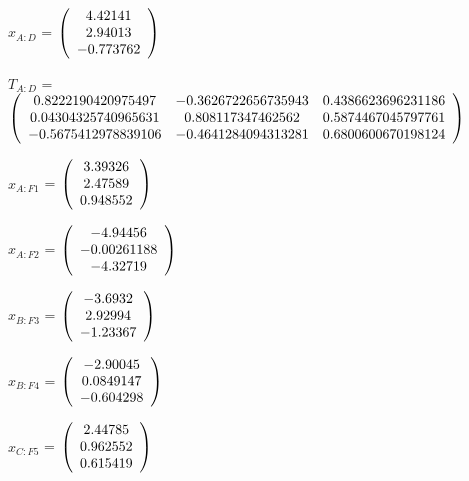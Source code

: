 \begin{description}
$x_{A:D}$ = $\left( \begin{array} {ccc}    4.42141 \\    2.94013 \\  -0.773762
\end{array} \right)\\ \\$

$T_{A:D}$ = $\left( \begin{array} {ccc}
   0.8222190420975497 & -0.3626722656735943 & 0.4386623696231186 \\
   0.04304325740965631 & 0.808117347462562 & 0.5874467045797761 \\
   -0.5675412978839106 & -0.4641284094313281 & 0.6800600670198124 \\
\end{array} \right)\\ \\$

$x_{A:F1}$ = $\left( \begin{array} {ccc}    3.39326 \\    2.47589 \\   0.948552
\end{array} \right)\\ \\$

$x_{A:F2}$ = $\left( \begin{array} {ccc}   -4.94456 \\ -0.00261188 \\   -4.32719
\end{array} \right)\\ \\$

$x_{B:F3}$ = $\left( \begin{array} {ccc}    -3.6932 \\    2.92994 \\   -1.23367
\end{array} \right)\\ \\$

$x_{B:F4}$ = $\left( \begin{array} {ccc}   -2.90045 \\  0.0849147 \\  -0.604298
\end{array} \right)\\ \\$

$x_{C:F5}$ = $\left( \begin{array} {ccc}    2.44785 \\   0.962552 \\   0.615419
\end{array} \right)\\ \\$


\end{description}
